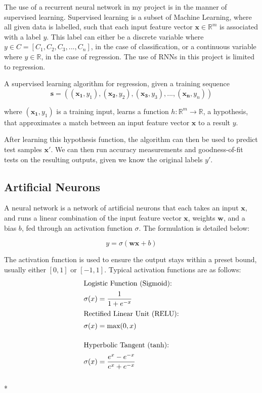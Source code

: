 \documentclass[12pt,a4paper,twoside,openright]{report}
\renewcommand{\vec}[1]{\mathbf{#1}}
\newcommand{\R}{\mathbb{R}}
\begin{document}
The use of a recurrent neural network in my project is in the manner of
supervised learning. Supervised learning is a subset of Machine Learning,
where all given data is labelled, such that each input feature vector $\vec{x} \in \R^m$
is associated with a label $y$. This label can either be a discrete variable where 
$y \in C = [C_1, C_2, C_3, ..., C_n]$,
in the case of classification, or a continuous variable where $y \in \R$, in the case of regression.
The use of RNNs in this project is limited to regression.

A supervised learning algorithm for regression, given a training sequence
\begin{equation}
\vec{s} = ((\vec{x_1}, y_1), (\vec{x_2}, y_2), (\vec{x_3}, y_3), ... , (\vec{x_n}, y_n))
\end{equation}

where $(\vec{x_1}, y_1)$ is a training input, learns a function $h: \R^m \rightarrow \R$,
a hypothesis, that approximates a match between an input feature vector $\vec{x}$ to a
result $y$.

After learning this hypothesis function, the algorithm can then be used to predict test
samples $\vec{x'}$. We can then run accuracy measurements and goodness-of-fit tests on
the resulting outputs, given we know the original labels $y'$.

\subsection{Artificial Neurons}

A neural network is a network of artificial neurons that each takes an input $\vec{x}$,
and runs a linear combination of the input feature vector $\vec{x}$, weights $\vec{w}$, and a bias $b$,
fed through an activation function $\sigma$. The formulation is detailed below:

\begin{equation}
y = \sigma (\vec{wx} + b)
\end{equation}

The activation function is used to ensure the output stays within a preset bound,
usually either $[0,1]$ or $[-1,1]$. Typical activation functions are as follows:
\begin{align}
\intertext{Logistic Function (Sigmoid):}
&\sigma(x) = \frac{1}{1+e^{-x}}\\
\intertext{Rectified Linear Unit (RELU):}
&\sigma(x) = \text{max}(0,x)\\[10pt]
\intertext{Hyperbolic Tangent (tanh):}
&\sigma(x) = \frac{e^x - e^{-x}}{e^x + e^{-x}}
\end{align}\\*
\end{document}
